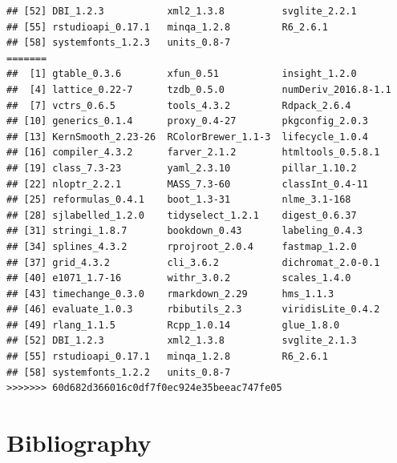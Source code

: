 \documentclass[
]{article}
\begin{document}
\begin{verbatim}
## [52] DBI_1.2.3           xml2_1.3.8          svglite_2.2.1      
## [55] rstudioapi_0.17.1   minqa_1.2.8         R6_2.6.1           
## [58] systemfonts_1.2.3   units_0.8-7
=======
##  [1] gtable_0.3.6        xfun_0.51           insight_1.2.0      
##  [4] lattice_0.22-7      tzdb_0.5.0          numDeriv_2016.8-1.1
##  [7] vctrs_0.6.5         tools_4.3.2         Rdpack_2.6.4       
## [10] generics_0.1.4      proxy_0.4-27        pkgconfig_2.0.3    
## [13] KernSmooth_2.23-26  RColorBrewer_1.1-3  lifecycle_1.0.4    
## [16] compiler_4.3.2      farver_2.1.2        htmltools_0.5.8.1  
## [19] class_7.3-23        yaml_2.3.10         pillar_1.10.2      
## [22] nloptr_2.2.1        MASS_7.3-60         classInt_0.4-11    
## [25] reformulas_0.4.1    boot_1.3-31         nlme_3.1-168       
## [28] sjlabelled_1.2.0    tidyselect_1.2.1    digest_0.6.37      
## [31] stringi_1.8.7       bookdown_0.43       labeling_0.4.3     
## [34] splines_4.3.2       rprojroot_2.0.4     fastmap_1.2.0      
## [37] grid_4.3.2          cli_3.6.2           dichromat_2.0-0.1  
## [40] e1071_1.7-16        withr_3.0.2         scales_1.4.0       
## [43] timechange_0.3.0    rmarkdown_2.29      hms_1.1.3          
## [46] evaluate_1.0.3      rbibutils_2.3       viridisLite_0.4.2  
## [49] rlang_1.1.5         Rcpp_1.0.14         glue_1.8.0         
## [52] DBI_1.2.3           xml2_1.3.8          svglite_2.1.3      
## [55] rstudioapi_0.17.1   minqa_1.2.8         R6_2.6.1           
## [58] systemfonts_1.2.2   units_0.8-7
>>>>>>> 60d682d366016c0df7f0ec924e35beeac747fe05
\end{verbatim}

\newpage

\section*{Bibliography}\label{bibliography}
\end{document}
